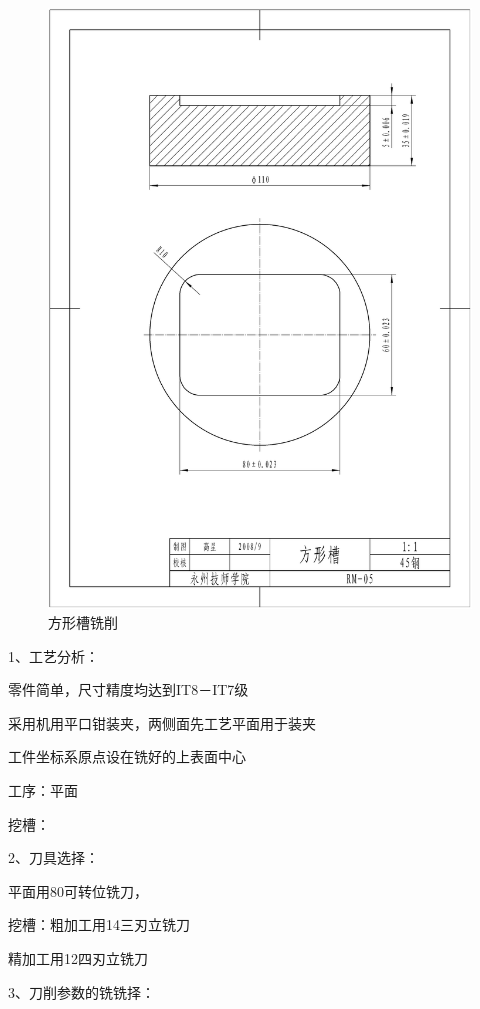 \begin{figure}[h]
	\centering
	\includegraphics[width=0.8\linewidth,trim=130 180 80  120,clip]{data/image/18-1.jpg}
	\caption{方形槽铣削}
	\label{fig:18-1}
\end{figure}

1、工艺分析：

零件简单，尺寸精度均达到IT8－IT7级

采用机用平口钳装夹，两侧面先工艺平面用于装夹

工件坐标系原点设在铣好的上表面中心

工序：平面

挖槽：

2、刀具选择：

平面用\diameter 80可转位铣刀，

挖槽：粗加工用\diameter 14三刃立铣刀

精加工用\diameter 12四刃立铣刀

3、刀削参数的铣铣择：

